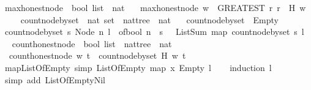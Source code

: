 \begin{isabellebody}
\ max{\isacharunderscore}honest{\isacharunderscore}node\ {\isacharcolon}{\isacharcolon}\ {\isachardoublequoteopen}bool\ list\ {\isasymRightarrow}\ nat{\isachardoublequoteclose}\ \isanewline
\ \ {\isachardoublequoteopen}max{\isacharunderscore}honest{\isacharunderscore}node\ w\ {\isacharequal}\ {\isacharparenleft}GREATEST\ r{\isachardot}\ r\ {\isasymin}\ H\ w{\isacharparenright}{\isachardoublequoteclose}\isanewline
\ \ \ \isanewline
{}\isamarkupfalse%
\ count{\isacharunderscore}node{\isacharunderscore}by{\isacharunderscore}set\ {\isacharcolon}{\isacharcolon}\ {\isachardoublequoteopen}nat\ set\ {\isasymRightarrow}\ nattree\ {\isasymRightarrow}\ nat{\isachardoublequoteclose}\ \isanewline
\ \ {\isachardoublequoteopen}count{\isacharunderscore}node{\isacharunderscore}by{\isacharunderscore}set\ {\isacharunderscore}\ Empty\ {\isacharequal}\ {}{\isachardoublequoteclose}\isanewline
{\isacharbar}\ {\isachardoublequoteopen}count{\isacharunderscore}node{\isacharunderscore}by{\isacharunderscore}set\ s\ {\isacharparenleft}Node\ n\ l{\isacharparenright}\ {\isacharequal}\ {\isacharparenleft}of{\isacharunderscore}bool\ {\isacharparenleft}n\ {\isasymin}\ s{\isacharparenright}{\isacharparenright}\ {\isacharplus}\ \ ListSum\ {\isacharparenleft}map\ {\isacharparenleft}count{\isacharunderscore}node{\isacharunderscore}by{\isacharunderscore}set\ s{\isacharparenright}\ l{\isacharparenright}{\isachardoublequoteclose}\ \ \isanewline
\isanewline
{}\isamarkupfalse%
\ count{\isacharunderscore}honest{\isacharunderscore}node\ {\isacharcolon}{\isacharcolon}\ {\isachardoublequoteopen}bool\ list\ {\isasymRightarrow}\ nattree\ {\isasymRightarrow}\ nat{\isachardoublequoteclose}\ \isanewline
\ \ {\isachardoublequoteopen}count{\isacharunderscore}honest{\isacharunderscore}node\ w\ t\ {\isacharequal}\ count{\isacharunderscore}node{\isacharunderscore}by{\isacharunderscore}set\ {\isacharparenleft}H\ w{\isacharparenright}\ t{\isachardoublequoteclose}\isanewline
\isanewline
{}\isamarkupfalse%
\ map{\isacharunderscore}ListOfEmpty\ {\isacharbrackleft}simp{\isacharbrackright}{\isacharcolon}\ {\isachardoublequoteopen}ListOfEmpty\ {\isacharparenleft}map\ {\isacharparenleft}{\isasymlambda}x{\isachardot}\ Empty{\isacharparenright}\ l{\isacharparenright}{\isachardoublequoteclose}\isanewline
%
\isadelimproof
\ \ %
\endisadelimproof
%
\isatagproof
{}\isamarkupfalse%
\ {\isacharparenleft}induction\ l{\isacharparenright}\isanewline
\ \ \isamarkupfalse%
\ {\isacharparenleft}simp\ add{\isacharcolon}\ ListOfEmpty{\isachardot}Nil{\isacharparenright}\isanewline

\end{isabellebody}

